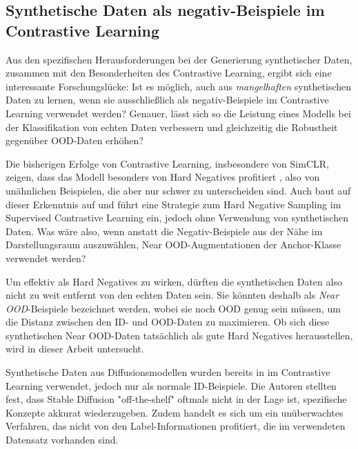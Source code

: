 \subsection{Synthetische Daten als negativ-Beispiele im Contrastive Learning} \label{subsec:synt-ood-contrastive}

Aus den spezifischen Herausforderungen bei der Generierung synthetischer Daten, zusammen mit den Besonderheiten des Contrastive Learning, ergibt sich eine interessante Forschungslücke: Ist es möglich, auch aus \emph{mangelhaften} synthetischen Daten zu lernen, wenn sie ausschließlich als negativ-Beispiele im Contrastive Learning verwendet werden? Genauer, lässt sich so die Leistung eines Modells bei der Klassifikation von echten Daten verbessern und gleichzeitig die Robustheit gegenüber OOD-Daten erhöhen?

Die bisherigen Erfolge von Contrastive Learning, insbesondere von SimCLR, zeigen, dass das Modell besonders von Hard Negatives profitiert \parencite{Chen2020simclr}, also von unähnlichen Beispielen, die aber nur schwer zu unterscheiden sind. Auch \parencite{Jiang2024supconhardnegatives} baut auf dieser Erkenntnis auf und führt eine Strategie zum Hard Negative Sampling im Supervised Contrastive Learning ein, jedoch ohne Verwendung von synthetischen Daten. Was wäre also, wenn anstatt die Negativ-Beispiele aus der Nähe im Darstellungsraum auszuwählen, Near OOD-Augmentationen der Anchor-Klasse verwendet werden?

Um effektiv als Hard Negatives zu wirken, dürften die synthetischen Daten also nicht zu weit entfernt von den echten Daten sein. Sie könnten deshalb als \emph{Near OOD}-Beispiele bezeichnet werden, wobei sie noch OOD genug sein müssen, um die Distanz zwischen den ID- und OOD-Daten zu maximieren. Ob sich diese synthetischen Near OOD-Daten tatsächlich als gute Hard Negatives herausstellen, wird in dieser Arbeit untersucht.

Synthetische Daten aus Diffusionsmodellen wurden bereits in \parencite{Tian2023stablerep} im Contrastive Learning verwendet, jedoch nur als normale ID-Beispiele. Die Autoren stellten fest, dass Stable Diffusion "off-the-shelf" oftmals nicht in der Lage ist, spezifische Konzepte akkurat wiederzugeben. Zudem handelt es sich um ein unüberwachtes Verfahren, das nicht von den Label-Informationen profitiert, die im verwendeten Datensatz vorhanden sind.

